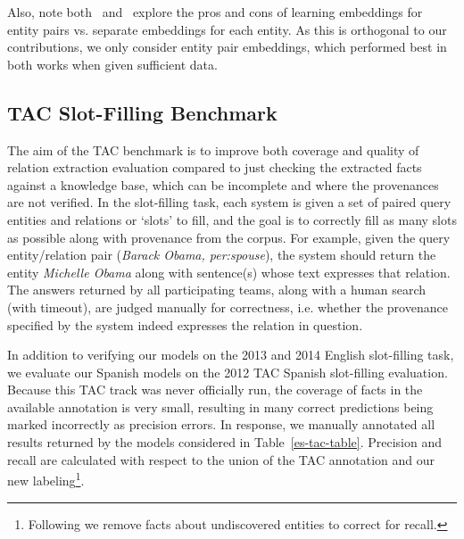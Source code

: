 Also, note both~\citet{toutanova2015representing} and~\citet{limin} explore the pros and cons of learning embeddings for entity pairs vs. separate embeddings for each entity. As this is orthogonal to our contributions, we only consider entity pair embeddings, which performed best in both works when given sufficient data.


\subsection{TAC Slot-Filling Benchmark}

The aim of the TAC benchmark is to improve both coverage and quality of relation extraction evaluation compared to just checking the extracted facts against a knowledge base, which can be incomplete and where the provenances are not verified. In the slot-filling task, each system is given a set of paired query entities and relations or `slots' to fill, and the goal is to correctly fill as many slots as possible along with provenance from the corpus. For example, given the query entity/relation pair (\emph{Barack Obama, per:spouse}), the system should return the entity \emph{Michelle Obama} along with sentence(s) whose text expresses that relation. The answers returned by all participating teams, along with a human search (with timeout), are judged manually for correctness, i.e. whether the provenance specified by the system indeed expresses the relation in question.


In addition to verifying our models on the 2013 and 2014 English slot-filling task, we evaluate our Spanish models on the 2012 TAC Spanish slot-filling evaluation. Because this TAC track was never officially run, the coverage of facts in the available annotation is very small, resulting in many correct predictions being marked incorrectly as precision errors. In response, we manually annotated all results returned by the models considered in Table~\ref{es-tac-table}. Precision and recall are calculated with respect to the union of the TAC annotation and our new labeling\footnote{Following \citet{surdeanu2012multi} we remove facts about undiscovered entities to correct for recall.}.


